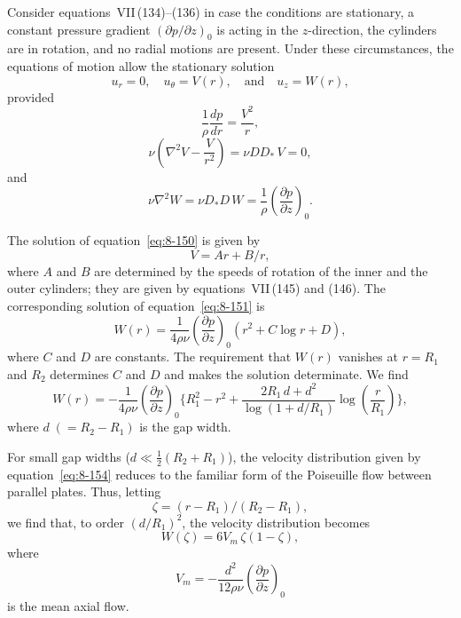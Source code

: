 Consider equations~VII\,(134)--(136) in case the conditions are stationary, a constant pressure gradient $(\partial p/\partial z)_0$ is acting in the $z$-direction, the cylinders are in rotation, and no radial motions are present. Under these circumstances, the equations of motion allow the stationary solution
\begin{equation}
\label{eq:8-148}
u_r = 0, \quad u_\theta = V(r), \quad \text{and} \quad u_z = W(r),
\end{equation}
provided
\begin{equation}
\label{eq:8-149}
\frac{1}{\rho}\frac{dp}{dr} = \frac{V^2}{r},
\end{equation}
\begin{equation}
\label{eq:8-150}
\nu\!\left(\nabla^2 V - \frac{V}{r^2}\right) = \nu DD_*\,V = 0,
\end{equation}
and
\begin{equation}
\label{eq:8-151}
\nu\nabla^2 W = \nu D_*D\,W = \frac{1}{\rho}\!\left(\frac{\partial p}{\partial z}\right)_{\!0}.
\end{equation}

The solution of equation~\eqref{eq:8-150} is given by
\begin{equation}
\label{eq:8-152}
V = Ar + B/r,
\end{equation}
where $A$ and $B$ are determined by the speeds of rotation of the inner and the outer cylinders; they are given by equations~VII\,(145) and (146). The corresponding solution of equation~\eqref{eq:8-151} is
\begin{equation}
\label{eq:8-153}
W(r) = \frac{1}{4\rho\nu}\!\left(\frac{\partial p}{\partial z}\right)_{\!0}(r^2 + C\log r + D),
\end{equation}
where $C$ and $D$ are constants. The requirement that $W(r)$ vanishes at $r = R_1$ and $R_2$ determines $C$ and $D$ and makes the solution determinate. We find
\begin{equation}
\label{eq:8-154}
W(r) = -\frac{1}{4\rho\nu}\!\left(\frac{\partial p}{\partial z}\right)_{\!0}\biggl\{R_1^2 - r^2 + \frac{2R_1\,d + d^2}{\log(1+d/R_1)}\log\!\left(\frac{r}{R_1}\right)\biggr\},
\end{equation}
where $d\;(= R_2 - R_1)$ is the gap width.

For small gap widths ($d \ll \frac{1}{2}(R_2+R_1)$), the velocity distribution given by equation~\eqref{eq:8-154} reduces to the familiar form of the Poiseuille flow between parallel plates. Thus, letting
\begin{equation}
\label{eq:8-155}
\zeta = (r-R_1)/(R_2-R_1),
\end{equation}
we find that, to order $(d/R_1)^2$, the velocity distribution becomes
\begin{equation}
\label{eq:8-156}
W(\zeta) = 6V_m\,\zeta(1-\zeta),
\end{equation}
where
\begin{equation}
\label{eq:8-157}
V_m = -\frac{d^2}{12\rho\nu}\!\left(\frac{\partial p}{\partial z}\right)_{\!0}
\end{equation}
is the mean axial flow.

